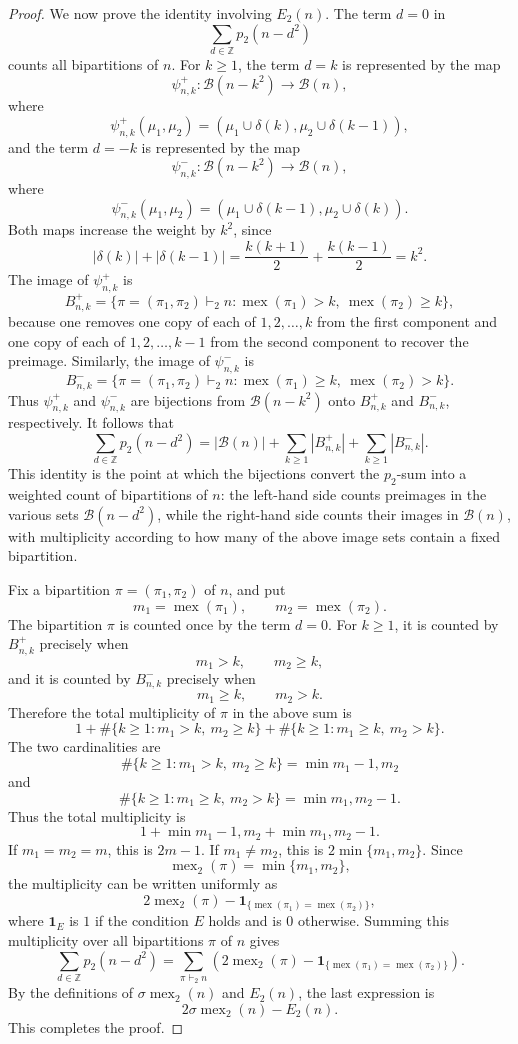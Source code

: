 \documentclass[12pt]{amsart}
\theoremstyle{definition}
\theoremstyle{remark}
\numberwithin{equation}{section}
\newcommand{\mex}{\operatorname{mex}}
\begin{document}
\begin{proof}
We now prove the identity involving $E_2(n)$.  The term $d=0$ in
\[
\sum_{d\in\mathbb Z}p_2(n-d^2)
\]
counts all bipartitions of $n$.  For $k\geq 1$, the term $d=k$ is represented by the map
\[
\psi^+_{n,k}:\mathcal B(n-k^2)\longrightarrow \mathcal B(n),
\]
where
\[
\psi^+_{n,k}(\mu_1,\mu_2)
=
(\mu_1\cup\delta(k),\mu_2\cup\delta(k-1)),
\]
and the term $d=-k$ is represented by the map
\[
\psi^-_{n,k}:\mathcal B(n-k^2)\longrightarrow \mathcal B(n),
\]
where
\[
\psi^-_{n,k}(\mu_1,\mu_2)
=
(\mu_1\cup\delta(k-1),\mu_2\cup\delta(k)).
\]
Both maps increase the weight by $k^2$, since
\[
|\delta(k)|+|\delta(k-1)|
=
\frac{k(k+1)}2+\frac{k(k-1)}2
=k^2.
\]
The image of $\psi^+_{n,k}$ is
\[
B^+_{n,k}
=
\{\pi=(\pi_1,\pi_2)\vdash_2 n:
\mex(\pi_1)>k,\ \mex(\pi_2)\geq k\},
\]
because one removes one copy of each of $1,2,\ldots,k$ from the first component and one copy of each of $1,2,\ldots,k-1$ from the second component to recover the preimage.  Similarly, the image of $\psi^-_{n,k}$ is
\[
B^-_{n,k}
=
\{\pi=(\pi_1,\pi_2)\vdash_2 n:
\mex(\pi_1)\geq k,\ \mex(\pi_2)>k\}.
\]
Thus $\psi^+_{n,k}$ and $\psi^-_{n,k}$ are bijections from $\mathcal B(n-k^2)$ onto $B^+_{n,k}$ and $B^-_{n,k}$, respectively.  It follows that
\[
\sum_{d\in\mathbb Z}p_2(n-d^2)
=
|\mathcal B(n)|+
\sum_{k\geq 1}|B^+_{n,k}|+
\sum_{k\geq 1}|B^-_{n,k}|.
\]
This identity is the point at which the bijections convert the $p_2$-sum into a weighted count of bipartitions of $n$: the left-hand side counts preimages in the various sets $\mathcal B(n-d^2)$, while the right-hand side counts their images in $\mathcal B(n)$, with multiplicity according to how many of the above image sets contain a fixed bipartition.

Fix a bipartition $\pi=(\pi_1,\pi_2)$ of $n$, and put
\[
m_1=\mex(\pi_1),
\qquad
m_2=\mex(\pi_2).
\]
The bipartition $\pi$ is counted once by the term $d=0$.  For $k\geq 1$, it is counted by $B^+_{n,k}$ precisely when
\[
m_1>k,
\qquad
m_2\geq k,
\]
and it is counted by $B^-_{n,k}$ precisely when
\[
m_1\geq k,
\qquad
m_2>k.
\]
Therefore the total multiplicity of $\pi$ in the above sum is
\[
1+\#\{k\geq 1:m_1>k,\ m_2\geq k\}
 +\#\{k\geq 1:m_1\geq k,\ m_2>k\}.
\]
The two cardinalities are
\[
\#\{k\geq 1:m_1>k,\ m_2\geq k\}=\min{m_1-1,m_2}
\]
and
\[
\#\{k\geq 1:m_1\geq k,\ m_2>k\}=\min{m_1,m_2-1}.
\]
Thus the total multiplicity is
\[
1+\min{m_1-1,m_2}+\min{m_1,m_2-1}.
\]
If $m_1=m_2=m$, this is $2m-1$.  If $m_1\neq m_2$, this is $2\min\{m_1,m_2\}$.  Since
\[
\mex_2(\pi)=\min\{m_1,m_2\},
\]
the multiplicity can be written uniformly as
\[
2\mex_2(\pi)-\mathbf{1}_{\{\mex(\pi_1)=\mex(\pi_2)\}},
\]
where $\mathbf{1}_E$ is $1$ if the condition $E$ holds and is $0$ otherwise.  Summing this multiplicity over all bipartitions $\pi$ of $n$ gives
\[
\sum_{d\in\mathbb Z}p_2(n-d^2)
=
\sum_{\pi\vdash_2 n}
\left(2\mex_2(\pi)-\mathbf{1}_{\{\mex(\pi_1)=\mex(\pi_2)\}}\right).
\]
By the definitions of $\sigma\mex_2(n)$ and $E_2(n)$, the last expression is
\[
2\sigma\mex_2(n)-E_2(n).
\]
This completes the proof.
\end{proof}
\end{document}
